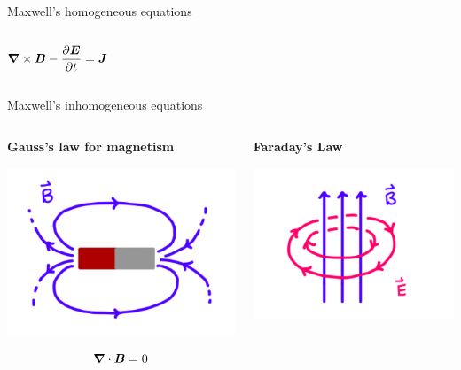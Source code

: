 \documentclass[aspectratio=169]{beamer}
\begin{document}
\begin{frame}{Maxwell's homogeneous equations}
\begin{columns}[c]
\begin{center}
    \vspace{-10mm}
    
    \small
    $$ \boldsymbol{\nabla} \times \boldsymbol{B} - \frac{\partial \boldsymbol{E}}{\partial t} = \boldsymbol{J} $$
    
    
    \end{center}
   
    
    \end{columns}
    
    
\end{frame}

\begin{frame}{Maxwell's inhomogeneous equations}
    \begin{columns}[c] 

    
    \begin{center} \textbf{Gauss's law for magnetism}
    
    
    \includegraphics[scale=.55]{figures/gauss_ii.png}
    
    \vspace{-10mm}
    
    $$ \boldsymbol{\nabla} \cdot \boldsymbol{B} = 0 $$
    
    \end{center}
    
    
    \begin{center}
    
    \textbf{Faraday's Law}
    
    \includegraphics[scale=.6]{figures/faraday.png}
    

\end{center}
\end{columns}
\end{frame}
\end{document}
